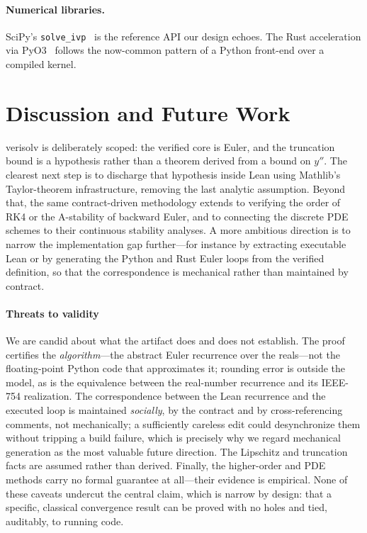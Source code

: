 \documentclass[sigplan,nonacm,screen]{acmart}
\begin{document}
\paragraph{Numerical libraries.}
SciPy's \texttt{solve\_ivp}~\cite{scipy2020} is the reference API our design
echoes. The Rust acceleration via PyO3~\cite{pyo3} follows the now-common pattern
of a Python front-end over a compiled kernel.

\section{Discussion and Future Work}
\label{sec:future}

verisolv is deliberately scoped: the verified core is Euler, and the truncation
bound is a hypothesis rather than a theorem derived from a bound on $y''$. The
clearest next step is to discharge that hypothesis inside Lean using Mathlib's
Taylor-theorem infrastructure, removing the last analytic assumption. Beyond
that, the same contract-driven methodology extends to verifying the order of RK4
or the A-stability of backward Euler, and to connecting the discrete PDE schemes
to their continuous stability analyses. A more ambitious direction is to narrow
the implementation gap further---for instance by extracting executable Lean or by
generating the Python and Rust Euler loops from the verified definition, so that
the correspondence is mechanical rather than maintained by contract.

\paragraph{Threats to validity}
We are candid about what the artifact does and does not establish. The proof
certifies the \emph{algorithm}---the abstract Euler recurrence over the reals---not
the floating-point Python code that approximates it; rounding error is outside the
model, as is the equivalence between the real-number recurrence and its IEEE-754
realization. The correspondence between the Lean recurrence and the executed loop
is maintained \emph{socially}, by the contract and by cross-referencing comments,
not mechanically; a sufficiently careless edit could desynchronize them without
tripping a build failure, which is precisely why we regard mechanical generation
as the most valuable future direction. The Lipschitz and truncation facts are
assumed rather than derived. Finally, the higher-order and PDE methods carry no
formal guarantee at all---their evidence is empirical. None of these caveats
undercut the central claim, which is narrow by design: that a specific, classical
convergence result can be proved with no holes and tied, auditably, to running
code.
\end{document}

